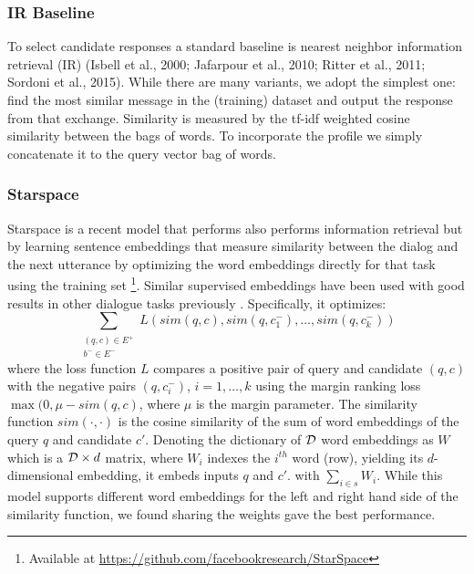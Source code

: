 


\ifarxiv
\subsubsection{IR Baseline}
To select candidate responses a standard baseline is nearest neighbor information retrieval (IR) (Isbell et al., 2000; Jafarpour et al., 2010; Ritter et al., 2011; Sordoni et al., 2015). 
While there are many variants, we adopt the simplest one: find the most similar message in the (training) dataset and output the response from that exchange. Similarity is measured by the tf-idf weighted cosine similarity between the bags of words. To incorporate the profile we simply concatenate it to the query vector bag of words. 


\subsubsection{Starspace}

Starspace is a recent model that performs also performs information retrieval but by learning sentence embeddings that measure similarity between the dialog and the next utterance by optimizing the word embeddings directly for that task using the training set \citep{wu2017starspace}\footnote{Available at \url{https://github.com/facebookresearch/StarSpace}}. Similar supervised embeddings have been used with good results in other dialogue tasks previously \citep{dodge2015evaluating}. 
Specifically, it optimizes:
\[
\label{math:loss}
\sum_{\substack{(q,c) \in E^+\\ b^{-} \in E^{-}}} L(sim(q, c), sim(q, c^{-}_1), \dots, sim(q, c^{-}_k))
\]
where the loss function $L$ compares a positive pair of query and candidate $(q,c)$ with the negative pairs $(q, c^{-}_i)$, $i=1,\dots, k$ using the margin ranking loss $\max(0,\mu - sim(q,c)$, where $\mu$ is the margin parameter. The similarity function $sim(\cdot, \cdot)$ is the cosine similarity of the sum of word embeddings of the query $q$ and candidate $c'$. Denoting the dictionary of ${\cal D}$ word embeddings as $W$ which is a ${\cal D} \times d$ matrix, where $W_i$ indexes the $i^{th}$ word (row), yielding its $d$-dimensional embedding, it embeds inputs $q$ and $c'$. 
  with $\sum_{i \in s} W_i$. While this model supports different word embeddings for the left and right hand side of the similarity function, we found sharing the weights gave the best performance.
  
